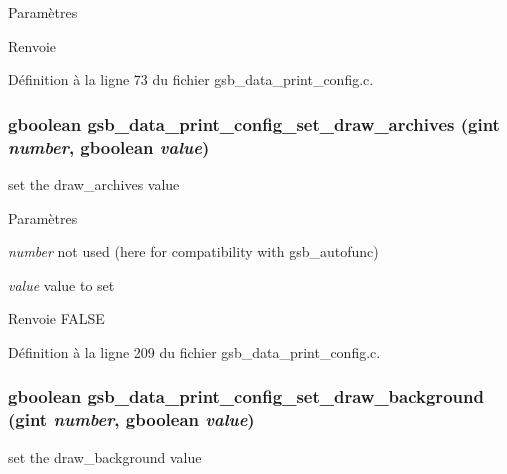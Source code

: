 \begin{DoxyParams}{Paramètres}
\item[{\em }]\end{DoxyParams}
\begin{DoxyReturn}{Renvoie}

\end{DoxyReturn}


Définition à la ligne 73 du fichier gsb\_\-data\_\-print\_\-config.c.

\subsubsection[{gsb\_\-data\_\-print\_\-config\_\-set\_\-draw\_\-archives}]{\setlength{\rightskip}{0pt plus 5cm}gboolean gsb\_\-data\_\-print\_\-config\_\-set\_\-draw\_\-archives (gint {\em number}, \/  gboolean {\em value})}\label{gsb__data__print__config_8h_a39ab91c1594098a305ee245957ce6e2b}
set the draw\_\-archives value


\begin{DoxyParams}{Paramètres}
\item[{\em number}]not used (here for compatibility with gsb\_\-autofunc) \item[{\em value}]value to set\end{DoxyParams}
\begin{DoxyReturn}{Renvoie}
FALSE 
\end{DoxyReturn}


Définition à la ligne 209 du fichier gsb\_\-data\_\-print\_\-config.c.

\subsubsection[{gsb\_\-data\_\-print\_\-config\_\-set\_\-draw\_\-background}]{\setlength{\rightskip}{0pt plus 5cm}gboolean gsb\_\-data\_\-print\_\-config\_\-set\_\-draw\_\-background (gint {\em number}, \/  gboolean {\em value})}\label{gsb__data__print__config_8h_ad06a44fa956ad56ee3ecbb4834c541c2}
set the draw\_\-background value


